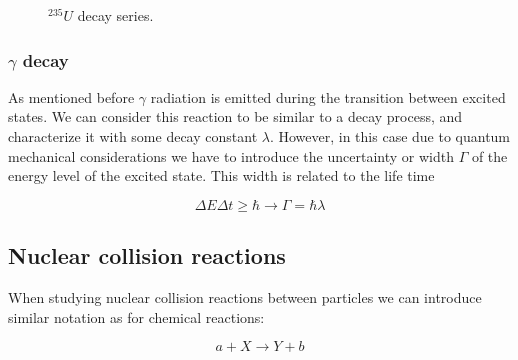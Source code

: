 \begin{figure}[ht!]
\protect {}\protect
\caption{\label{fig:decaychain} \footnotesize{${}^{235}U$ decay series.}}
\end{figure}

\subsubsection*{$\gamma$ decay}

As mentioned before $\gamma$ radiation is emitted during the transition between excited states. We can consider this reaction to be similar to a decay process, and characterize it with some decay constant $\lambda$. However, in this case due to quantum mechanical considerations we have to introduce the uncertainty or width $\Gamma$ of the energy level of the excited state. This width is related to the life time

\begin{equation}
\Delta E \Delta t \geq \hbar \rightarrow \Gamma=\hbar \lambda
\end{equation}

\subsection{Nuclear collision reactions}

When studying nuclear collision reactions between particles we can introduce similar notation as for chemical reactions:

\begin{equation}\label{eq:reaction}
a+X \rightarrow Y+b
\end{equation}

